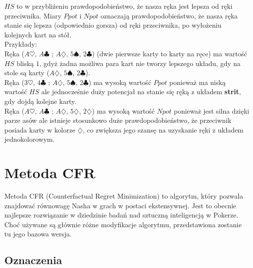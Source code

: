 \documentclass[licencjacka]{pracamgr}
\begin{document}
\noindent
$HS$ to w przybliżeniu prawdopodobieństwo, że nasza ręka jest lepsza od ręki przeciwnika. Miary $Ppot$ i $Npot$ oznaczają
prawdopodobieństwo, że nasza ręka stanie się lepsza (odpowiednio gorsza) od ręki przeciwnika, po wyłożeniu kolejnych kart na stół. \\

\noindent
Przykłady: \\

\noindent
Ręka ($A\heartsuit$, $A\clubsuit$ ; $A\diamondsuit$, $5\spadesuit$, $2\clubsuit$) (dwie pierwsze karty to karty na ręce) ma wartość $HS$
bliską $1$, gdyż żadna możliwa para kart nie tworzy lepszego układu, gdy na stole są karty ($A\diamondsuit$, $5\spadesuit$, $2\clubsuit$). \\

\noindent
Ręka ($3\heartsuit$, $4\clubsuit$ ; $A\diamondsuit$, $5\spadesuit$, $2\clubsuit$) ma wysoką wartość $Ppot$ ponieważ ma niską wartość $HS$
ale jednocześnie duży potencjał na stanie się ręką z układem \textbf{strit}, gdy dojdą kolejne karty. \\

\noindent
Ręka ($A\heartsuit$, $A\clubsuit$ ; $A\diamondsuit$, $5\diamondsuit$, $2\diamondsuit$) ma wysoką wartość $Npot$ ponieważ jest silna
dzięki parze asów ale istnieje stosunkowo duże prawdopodobieństwo, że przeciwnik posiada karty w kolorze $\diamondsuit$, co zwiększa jego szansę
na uzyskanie ręki z układem jednokolorowym.


\chapter{Metoda CFR}

Metoda CFR (Counterfactual Regret Minimization) to algorytm, który pozwala znajdować równowagę Nasha
w grach w postaci ekstensywnej. Jest to obecnie najlepsze rozwiązanie w dziedzinie badań nad
sztuczną inteligencją w Pokerze. Choć używane są głównie różne modyfikacje algorytmu,
przedstawiona zostanie tu jego bazowa wersja.

\section{Oznaczenia}
\end{document}
